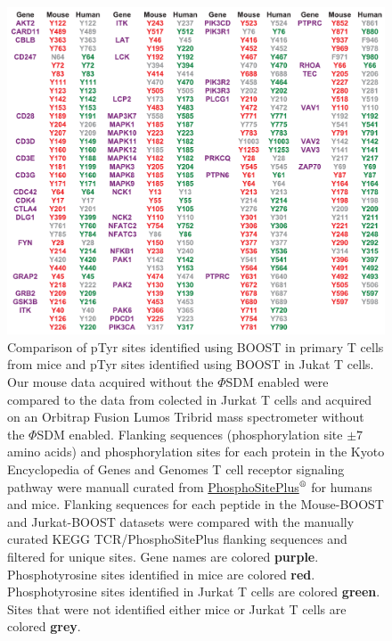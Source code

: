 \documentclass[journal=jprobs,manuscript=article]{achemso}
\begin{document}
\begin{figure}[t!]
\centering
\includegraphics[width=165mm]{figures/supplements/mouse_jurkat_keggtcr.pdf}
\caption{Comparison of pTyr sites identified using BOOST in primary T cells from mice and pTyr sites identified using BOOST in Jukat T cells. Our mouse data acquired without the $\Phi$SDM enabled were compared to the data from \citeauthor{chua2020tandem} colected in Jurkat T cells and acquired on an Orbitrap Fusion Lumos Tribrid mass spectrometer without the $\Phi$SDM enabled. Flanking sequences (phosphorylation site $\pm7$ amino acids) and phosphorylation sites for each protein in the Kyoto Encyclopedia of Genes and Genomes T cell receptor signaling pathway were manuall curated from \href{https://www.phosphosite.org}{PhosphoSitePlus$^{\text{\textregistered}}$}\cite{hornbeck2015phosphositeplus} for humans and mice. Flanking sequences for each peptide in the Mouse-BOOST and Jurkat-BOOST datasets were compared with the manually curated KEGG TCR/PhosphoSitePlus flanking sequences and filtered for unique sites. Gene names are colored \textbf{{\color{Purple}purple}}. Phosphotyrosine sites identified in mice are colored \textbf{{\color{Red}red}}. Phosphotyrosine sites identified in Jurkat T cells are colored \textbf{{\color{ForestGreen}green}}. Sites that were not identified either mice or Jurkat T cells are colored \textbf{{\color{Gray}grey}}. }\label{mouse_jurkat_keggtcr}
\end{figure}

\clearpage


\end{document}
